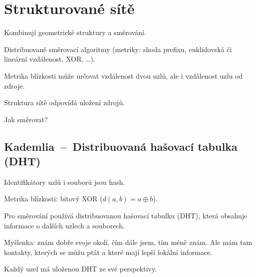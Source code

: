 
\section{Strukturované sítě}

\begin{compactitem}
    \item Kombinují geometrické struktury a směrování.
    \item Distribuované směrovací algoritmy (metriky: shoda prefixu, euklidovská či lineární vzdálenost, XOR, \dots). \begin{compactitem}
        \item Metrika blízkosti může určovat vzdálenost dvou uzlů, ale i vzdálenost uzlu od zdroje.
    \end{compactitem}
    \item Struktura sítě odpovídá uložení zdrojů.
    \item Jak směrovat?
\end{compactitem}

\subsection{Kademlia~--~Distribuovaná hašovací tabulka (DHT)}

\begin{compactitem}
    \item Identifikátory uzlů i souborů jsou hash.
    \item Metrika blízkosti: bitový XOR ($d(a, b) = a \oplus b$).
    \item Pro směrování používá distribuovanou hašovací tabulku (DHT), která obsahuje informace o dalších uzlech a souborech. \begin{compactitem}
        \item Myšlenka: znám dobře svoje okolí, čím dále jsem, tím méně znám. Ale mám tam kontakty, kterých se můžu ptát a které mají lepší lokální informace.
        \item Každý uzel má uloženou DHT ze své perspektivy.
    \end{compactitem}
\end{compactitem}

